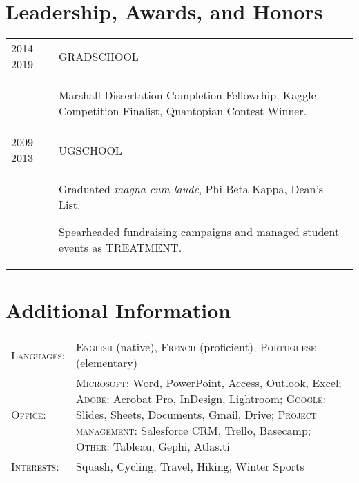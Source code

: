 \documentclass[a4paper,10pt]{article}
\begin{document}
\section{Leadership, Awards, and Honors}
\begin{supertabular}{p{3.4cm} p{13.9cm}}

	\textsc{2014-2019} 				& \textsc{GRADSCHOOL} \\
														& \begin{enumerate*}[label =$\diamond$, itemjoin={\newline}]
																\item \footnotesize Marshall Dissertation Completion Fellowship, Kaggle Competition Finalist, Quantopian Contest Winner.
																\end{enumerate*} \vspace{2mm} \\

	\textsc{2009-2013} 				& \textsc{UGSCHOOL} \\
														& \begin{enumerate*}[label =$\diamond$, itemjoin={\newline}]
																\item \footnotesize  Graduated \emph{magna cum laude}, Phi Beta Kappa, Dean's List.
																\item \footnotesize  Spearheaded fundraising campaigns and managed student events as TREATMENT.
																\end{enumerate*} \vspace{2mm} \\



\end{supertabular}



\section{Additional Information}
\begin{supertabular}{p{3.4cm} p{13.9cm}}
	\textsc{Languages:}			& \small\textsc{English} (native), \textsc{French} (proficient), \textsc{Portuguese} (elementary) \vspace{1mm} \\

	\textsc{Office:}					& \small\textsc{Microsoft}: \footnotesize Word, PowerPoint, Access, Outlook, Excel;	\small\textsc{Adobe}: \footnotesize Acrobat Pro, InDesign, Lightroom; \small\textsc{Google}: \footnotesize Slides, Sheets, Documents, Gmail, Drive; \small\textsc{Project management:} \footnotesize Salesforce CRM, Trello, Basecamp; \small\textsc{Other:} \footnotesize Tableau, Gephi, Atlas.ti \vspace{1mm} \\
	\textsc{Interests:} 		& \small Squash, Cycling, Travel, Hiking, Winter Sports \\

\end{supertabular}
\end{document}
